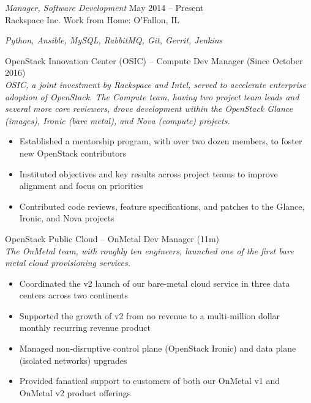 \documentclass[margin,line]{resume}
\begin{document}
\begin{resume}
{\sl Manager, Software Development}  \hfill  May 2014 -- Present\\
Rackspace Inc.  \hfill  Work from Home: O'Fallon, IL\\[2pt]
{\small\centering\textit{Python, Ansible, MySQL, RabbitMQ, Git, Gerrit, Jenkins}\par}\vspace*{-\baselineskip}
\vspace{2pt}
{\small OpenStack Innovation Center (OSIC) -- Compute  \hfill  Dev Manager (Since October 2016)}\\
{\small\textit{OSIC, a joint investment by Rackspace and Intel, served to accelerate enterprise adoption of OpenStack.
The Compute team, having two project team leads and several more core reviewers, drove development within the OpenStack
Glance (images), Ironic (bare metal), and Nova (compute) projects.}}
\begin{itemize} \itemsep -2pt %
\small\item Established a mentorship program, with over two dozen members, to foster new OpenStack contributors
\small\item Instituted objectives and key results across project teams to improve alignment and focus on priorities
\small\item Contributed code reviews, feature specifications, and patches to the Glance, Ironic, and Nova projects
\end{itemize}\vspace*{-\baselineskip} %
\vspace{2pt}
{\small OpenStack Public Cloud -- OnMetal  \hfill  Dev Manager (11m)}\\
{\small\textit{The OnMetal team, with roughly ten engineers, launched one of the first bare metal cloud provisioning services.}}
\begin{itemize} \itemsep -2pt %
\small\item Coordinated the v2 launch of our bare-metal cloud service in three data centers across two continents
\small\item Supported the growth of v2 from no revenue to a multi-million dollar monthly recurring revenue product
\small\item Managed non-disruptive control plane (OpenStack Ironic) and data plane (isolated networks) upgrades
\small\item Provided fanatical support to customers of both our OnMetal v1 and OnMetal v2 product offerings

\end{itemize}
\end{resume}
\end{document}
